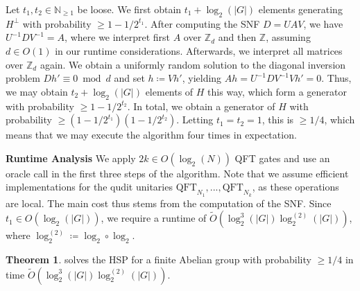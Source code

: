 \documentclass[10pt]{amsart}
\numberwithin{equation}{section}
\theoremstyle{definition}
\newtheorem{theorem}{Theorem}
\theoremstyle{remark}
\begin{document}
    Let \(t_1, t_2 \in \mathbb{N}_{\geq 1}\) be loose. We first obtain \(t_1 + \log_2(|G|)\) elements generating \(H^\perp\) with probability \(\geq 1-1/2^{t_1}\). After computing the SNF \(D = UAV\), we have \(U^{-1}DV^{-1}=A\), where we interpret first \(A\) over \(\mathbb{Z}_d\) and then \(\mathbb{Z}\), assuming \(d \in O(1)\) in our runtime considerations. Afterwards, we interpret all matrices over \(\mathbb{Z}_d\) again. We obtain a uniformly random solution to the diagonal inversion problem \(Dh' \equiv 0 \bmod d\) and set \(h \coloneqq Vh'\), yielding \(Ah = U^{-1}DV^{-1}Vh' = 0\). Thus, we may obtain \(t_2 + \log_2(|G|)\) elements of \(H\) this way, which form a generator with probability \(\geq 1 - 1/2^{t_2}\). In total, we obtain a generator of \(H\) with probability \(\geq (1-1/2^{t_1})(1-1/2^{t_2})\). Letting \(t_1 = t_2 = 1\), this is \(\geq 1/4\), which means that we may execute the algorithm four times in expectation.

    \textbf{Runtime Analysis} We apply \(2k \in O(\log_2(N))\) QFT gates and use an oracle call in the first three steps of the algorithm. Note that we assume efficient implementations for the qudit unitaries \(\text{QFT}_{N_1}, ..., \text{QFT}_{N_k}\), as these operations are local. The main cost thus stems from the computation of the SNF. Since \(t_1 \in O(\log_2(|G|))\), we require a runtime of \(\tilde{O}(\log_2^3(|G|)\log_2^{(2)}(|G|))\), where \(\log_2^{(2)} \coloneqq \log_2 \circ \log_2\).

    \begin{theorem}
         solves the HSP for a finite Abelian group with probability \(\geq 1/4\) in time \(\tilde{O}(\log_2^3(|G|)\log_2^{(2)}(|G|))\).
    \end{theorem}

    \printbibliography{}
\end{document}
